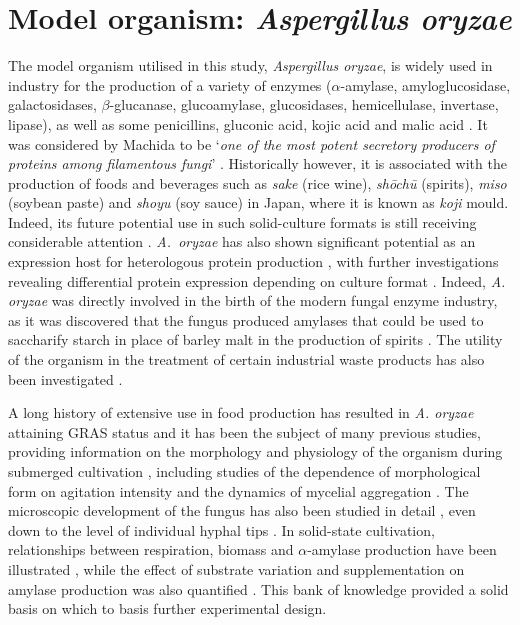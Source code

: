 \section{Model organism: \emph{Aspergillus oryzae}}

The model organism utilised in this study, \emph{Aspergillus oryzae}, is widely used in industry for the production of a variety of enzymes ($\alpha$-amylase, amyloglucosidase, galactosidases, $\beta$-glucanase, glucoamylase, glucosidases, hemicellulase, invertase, lipase), as well as some penicillins, gluconic acid, kojic acid and malic acid \cite{papagiannireview}. It was considered by Machida to be \lq \emph{one of the most potent secretory producers of proteins among filamentous fungi}' \cite{machida2002}. Historically however, it is associated with the production of foods and beverages such as \emph{sake} (rice wine), \emph{sh\={o}ch\={u}} (spirits), \emph{miso} (soybean paste) and \emph{shoyu} (soy sauce) in Japan, where it is known as \emph{koji} mould. Indeed, its future potential use in such solid-culture formats is still receiving considerable attention \cite{machida2008}. \emph{A.~oryzae} has also shown significant potential as an expression host for heterologous protein production \cite{wang2005}, with further investigations revealing differential protein expression depending on culture format \cite{ tebiesebeke2002,oda2006}. Indeed, \emph{A. oryzae} was directly involved in the birth of the modern fungal enzyme industry, as it was discovered that the fungus produced amylases that could be used to saccharify starch in place of barley malt in the production of spirits \cite{smith1983}. The utility of the organism in the treatment of certain industrial waste products has also been investigated \cite{truong2004}.

A long history of extensive use in food production has resulted in \emph{A. oryzae} attaining GRAS status and it has been the subject of many previous studies, providing information on the morphology and physiology of the organism during submerged cultivation \cite{carlsen1996a,spohr1997,carlsen1996b}, including studies of the dependence of morphological form on agitation intensity \cite{amanullah2002} and the dynamics of mycelial aggregation \cite{amanullah2001}. The microscopic development of the fungus has also been studied in detail \cite{spohr1998,muller2002}, even down to the level of individual hyphal tips \cite{haack2006}. In solid-state cultivation, relationships between respiration, biomass and $\alpha$-amylase production have been illustrated \cite{rahardjo2005a, rahardjo2005b}, while the effect of substrate variation and supplementation on amylase production was also quantified \cite{ramachandran2004}. This bank of knowledge provided a solid basis on which to basis further experimental design.